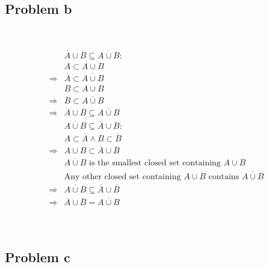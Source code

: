 \documentclass{article}
\begin{document}
~

\subsection*{Problem b}

~

\begin{equation*}
    \begin{split}
        &\overline{A}\cup\overline{B}\subseteq\overline{A\cup B}:\\
        &A\subset A\cup B\\
        \Rightarrow&\overline{A}\subset \overline{A\cup B}\\
        &B\subset A\cup B\\
        \Rightarrow&\overline{B}\subset \overline{A\cup B}\\
        \Rightarrow&\overline{A}\cup\overline{B}\subseteq\overline{A\cup B}\\
        &\overline{A\cup B}\subseteq\overline{A}\cup\overline{B}:\\  
        &A\subset \overline{A}\land B\subset\overline{B}\\
        \Rightarrow&A\cup B\subset\overline{A}\cup\overline{B}\\
        &\overline{A\cup B}\text{ is the smallest closed set containing } A\cup B\\
        &\text{Any other closed set containing }A\cup B\text{ contains }\overline{A\cup B}\\
        \Rightarrow&\overline{A\cup B}\subseteq \overline{A}\cup\overline{B}\\
        \Rightarrow&\overline{A}\cup\overline{B}=\overline{A\cup B}\\   
    \end{split}
\end{equation*}

~

\subsection*{Problem c}

~
\end{document}
